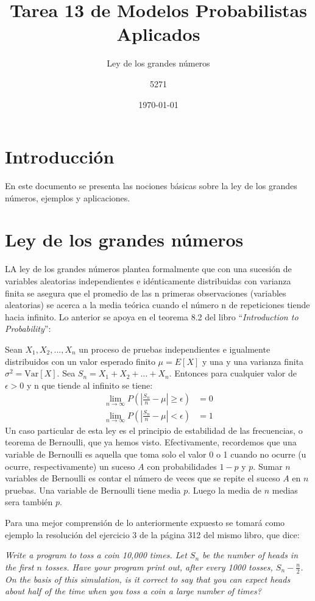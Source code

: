 \documentclass{article}
\title{Tarea 13 de Modelos Probabilistas Aplicados}
\subtitle{Ley de los grandes números}
\author{5271}
\date{\today}
\begin{document}
\maketitle
\section{Introducción}
En este documento se presenta las nociones básicas sobre la ley de los grandes números, ejemplos y aplicaciones.
\section{Ley de los grandes números}
LA ley de los grandes números plantea formalmente que con una sucesión de variables aleatorias independientes e idénticamente distribuidas con varianza finita se asegura que el promedio de las n primeras observaciones (variables aleatorias) se acerca a la media teórica cuando el número n de repeticiones tiende hacia infinito. Lo anterior se apoya en el teorema 8.2 del libro ``\textit{Introduction to Probability}''\cite{libProba}:

Sean $X_1,X_2,...,X_n$ un proceso de pruebas independientes e igualmente distribuidos con un valor esperado finito $\mu = E[X]$ y una y una varianza finita $\sigma^2 = \mbox{Var}[X]$. Sea $S_n = X_1 + X_2 + \ldots + X_n$. Entonces para cualquier valor de $\epsilon > 0$ y n que tiende al infinito se tiene:
\begin{align}
  \lim_{n \rightarrow \infty} P\left( \left | \frac{S_n}{n} - \mu \right | \geq \epsilon \right )  & = 0  \\
  \lim_{n \rightarrow \infty} P\left( \left | \frac{S_n}{n} - \mu \right | < \epsilon \right ) &= 1
\end{align}
Un caso particular de esta ley es el principio de estabilidad de las frecuencias, o teorema de Bernoulli, que ya hemos visto. Efectivamente, recordemos que una variable de Bernoulli es aquella que toma solo el valor 0 o 1 cuando no ocurre (u ocurre, respectivamente) un suceso $A$   con probabilidades $1-p$ y $p$. Sumar $n$ variables de Bernoulli es contar el número de veces que se repite el suceso $A$ en $n$ pruebas. Una variable de Bernoulli tiene media $p$. Luego la media de $n$ medias sera también $p$.

 Para una mejor comprensión de lo anteriormente expuesto se tomará como ejemplo la resolución del ejercicio 3 de la página 312 del mismo libro, que dice:
 
\textit{Write a program to toss a coin 10,000 times. Let $S_n$ be the number of heads in the first $n$ tosses. Have your program print out, after every 1000 tosses, $S_n - \frac{n}{2}$. On the basis of this simulation, is it correct to say that you can expect heads about half of the time when you toss a coin a large number of times?} 
\end{document}
